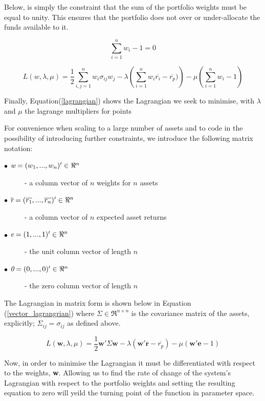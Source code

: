 \documentclass{article}
\begin{document}
Below, is simply the constraint that the sum of the portfolio weights must be equal to unity. This ensures that the portfolio does not over or under-allocate the funds available to it.

\begin{equation} 
\sum_{i=1}^{n} w_{i} - 1 = 0
\label{weights_constraint}
\end{equation}

\begin{equation} 
L(w, \lambda, \mu) =  \dfrac{1}{2} \sum_{i,j=1}^{n} w_{i} \sigma_{ij} w_{j} 
	-\lambda \left( \sum_{i=1}^{n} w_{i} \overline{r_i} - \overline{r_p}) \right)
	- \mu \left( \sum_{i=1}^{n} w_{i} - 1 \right)
\label{lagrangian}
\end{equation}

Finally, Equation(\ref{lagrangian}) shows the Lagrangian we seek to minimise, with $\lambda$ and $\mu$ the lagrange multipliers for points 

For convenience when scaling to a large number of assets and to code in the possibility of introducing further constraints, we introduce the following matrix notation:

\begin{description}
\item [$\bullet$ $\emph{w} = (w_1,..., w_n)' \in \Re^n$ ] - a column vector of $n$ weights for $n$ assets
\item [$\bullet$ $\overline{\emph{r}} = (\overline{r_1},..., \overline{r_n})' \in \Re^n$ ] - a column vector of $n$ expected asset returns
\item [$\bullet$ $\emph{e} = (1,..., 1)' \in \Re^n$ ] - the unit column vector of length $n$
\item [$\bullet$ $\emph{0} = (0,..., 0)' \in \Re^n$ ] - the zero column vector of length $n$
\end{description}

The Lagrangian in matrix form is shown below in Equation (\ref{vector_lagrangrian}) where $\Sigma \in \Re^{n \times n}$ is the covariance matrix of the assets, explicitly; $\Sigma_{ij} = \sigma_{ij}$ as defined above.

\begin{equation} 
L(\textbf{w}, \lambda, \mu)  = \dfrac{1}{2} \textbf{w}'\Sigma\textbf{w}
-\lambda \left( \textbf{w}'\overline{\textbf{r}} - \overline{r_p}\right)
-\mu \left( \textbf{w}'\textbf{e} - 1\right)
\label{vector_lagrangrian}
\end{equation}

Now, in order to minimise the Lagrangian it must be differentiated with respect to the weights, {\textbf{w}}. Allowing us to find the rate of change of the system's Lagrangian with respect to the portfolio weights and setting the resulting equation to zero will yeild the turning point of the function in parameter space.
\end{document}
